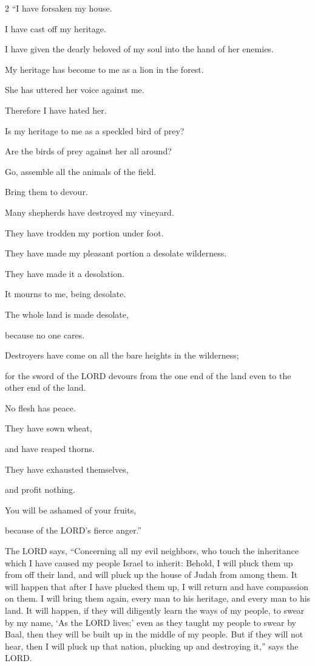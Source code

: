 \begin{multicols}{2}
	\myverse{}“I have forsaken my house.
	
	I have cast off my heritage.
	
	I have given the dearly beloved of my soul into the hand of her enemies.
	
	
	\myverse{}My heritage has become to me as a lion in the forest.
	
	She has uttered her voice against me.
	
	Therefore I have hated her.
	
	
	\myverse{}Is my heritage to me as a speckled bird of prey?
	
	Are the birds of prey against her all around?
	
	Go, assemble all the animals of the field.
	
	Bring them to devour.
	
	
	\myverse{}Many shepherds have destroyed my vineyard.
	
	They have trodden my portion under foot.
	
	They have made my pleasant portion a desolate wilderness.
	
	
	\myverse{}They have made it a desolation.
	
	It mourns to me, being desolate.
	
	The whole land is made desolate,
	
	because no one cares.
	
	
	\myverse{}Destroyers have come on all the bare heights in the wilderness;
	
	for the sword of the LORD devours from the one end of the land even to the other
	end of the land.
	
	No flesh has peace.
	
	
	\myverse{}They have sown wheat,
	
	and have reaped thorns.
	
	They have exhausted themselves,
	
	and profit nothing.
	
	You will be ashamed of your fruits,
	
	because of the LORD’s fierce anger.”
	
\end{multicols}

\myverse{}The LORD says, “Concerning all my evil neighbors, who touch the inheritance which I have caused my people Israel to inherit: Behold, I will pluck them up from off their land, and will pluck up the house of Judah from among them. \myverse{}It will happen that after I have plucked them up, I will return and have compassion on them. I will bring them again, every man to his heritage, and every man to his land. \myverse{}It will happen, if they will diligently learn the ways of my people, to swear by my name, ‘As the LORD lives;’ even as they taught my people to swear by Baal, then they will be built up in the middle of my people. \myverse{}But if they will not hear, then I will pluck up that nation, plucking up and destroying it,” says the LORD.


